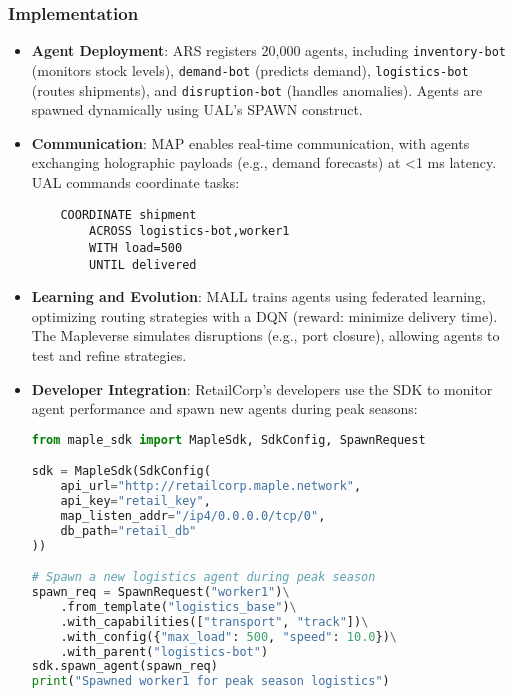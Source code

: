 \documentclass[a4paper,11pt]{article}
\begin{document}
\subsubsection{Implementation}
\begin{itemize}[leftmargin=*]
    \item \textbf{Agent Deployment}: ARS registers 20,000 agents, including \texttt{inventory-bot} (monitors stock levels), \texttt{demand-bot} (predicts demand), \texttt{logistics-bot} (routes shipments), and \texttt{disruption-bot} (handles anomalies). Agents are spawned dynamically using UAL’s SPAWN construct.
    \item \textbf{Communication}: MAP enables real-time communication, with agents exchanging holographic payloads (e.g., demand forecasts) at <1 ms latency. UAL commands coordinate tasks:
    \begin{verbatim}
    COORDINATE shipment
        ACROSS logistics-bot,worker1
        WITH load=500
        UNTIL delivered
    \end{verbatim}
    \item \textbf{Learning and Evolution}: MALL trains agents using federated learning, optimizing routing strategies with a DQN (reward: minimize delivery time). The Mapleverse simulates disruptions (e.g., port closure), allowing agents to test and refine strategies.
    \item \textbf{Developer Integration}: RetailCorp’s developers use the SDK to monitor agent performance and spawn new agents during peak seasons:
    \begin{lstlisting}[language=Python, caption={Python SDK for Supply Chain}, label={lst:supply-chain}]
from maple_sdk import MapleSdk, SdkConfig, SpawnRequest

sdk = MapleSdk(SdkConfig(
    api_url="http://retailcorp.maple.network",
    api_key="retail_key",
    map_listen_addr="/ip4/0.0.0.0/tcp/0",
    db_path="retail_db"
))

# Spawn a new logistics agent during peak season
spawn_req = SpawnRequest("worker1")\
    .from_template("logistics_base")\
    .with_capabilities(["transport", "track"])\
    .with_config({"max_load": 500, "speed": 10.0})\
    .with_parent("logistics-bot")
sdk.spawn_agent(spawn_req)
print("Spawned worker1 for peak season logistics")
    \end{lstlisting}
\end{itemize}
\end{document}

